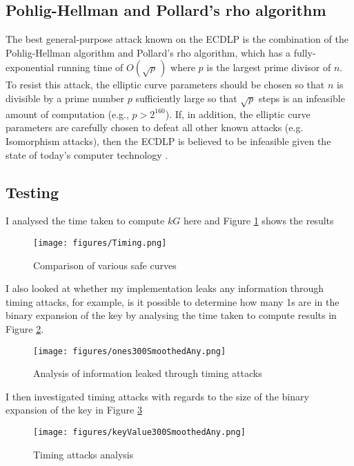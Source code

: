 \documentclass[12pt,a4paper]{article}
\begin{document}
\subsection{Pohlig-Hellman and Pollard's rho algorithm} \label{Pohlig-Hellman and Pollard's rho algorithm}
The best general-purpose attack known on the ECDLP is the combination of the Pohlig-Hellman algorithm and Pollard's rho algorithm, 
which has a fully-exponential running time of $O( \sqrt p \,)$ where $p$ is the largest prime divisor of $n$. 
To resist this attack, the elliptic curve parameters should be chosen so that $n$ is divisible by a prime number $p$ sufficiently large 
so that $\sqrt p$ steps is an infeasible amount of computation (e.g., $p > 2^{160}$).
If, in addition, the elliptic curve parameters are carefully chosen to defeat all other known attacks (e.g. Isomorphism attacks), 
then the ECDLP is believed to be infeasible given the state of today's computer technology \cite{hankerson2003guide}.

\subsection{Testing}
I analysed the time taken to compute $kG$ here and Figure \ref{fig:curves} shows the results
\begin{figure}[htb]
    \centering
    \texttt{[image: figures/Timing.png]}
    \caption{Comparison of various safe curves}
    \label{fig:curves}
\end{figure}

I also looked at whether my implementation leaks any information through timing attacks, 
for example, is it possible to determine how many 1s are in the binary expansion of the key by analysing the time taken to compute 
results in Figure \ref{fig:number1s}. 
\begin{figure}[htb]
    \centering
    \texttt{[image: figures/ones300SmoothedAny.png]}
    \caption{Analysis of information leaked through timing attacks}
    \label{fig:number1s}
\end{figure}

I then investigated timing attacks with regards to the size of the binary expansion of the key in Figure \ref{fig:logbase2}
\begin{figure}[htb]
    \centering
    \texttt{[image: figures/keyValue300SmoothedAny.png]}
    \caption{Timing attacks analysis}
    \label{fig:logbase2}
\end{figure}
\end{document}
